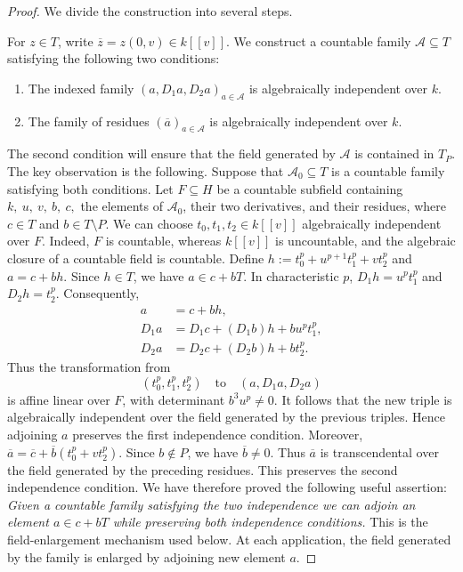 \documentclass[11pt,a4paper]{amsart}
\numberwithin{equation}{section}
\begin{document}
\begin{proof}
	We divide the construction into several steps.

For $z\in T$, write
$\overline z=z(0,v)\in k[[v]].$
We construct a countable family $\mathcal A\subseteq T$ satisfying
the following two conditions:
\begin{enumerate}
\item The indexed family
$(a,D_1a,D_2a)_{a\in\mathcal A}	$
is algebraically independent over $k$.
\item The family of residues
$(\overline a)_{a\in\mathcal A}$
is algebraically independent over $k$.
\end{enumerate}
	
The second condition will ensure that the field generated by
$\mathcal A$ is contained in $T_P$.
The key observation is the following. Suppose that
$\mathcal A_0\subseteq T$ is a countable family satisfying both
conditions. Let $F\subseteq H$ be a countable subfield containing
$	k,\ u,\ v,\ b,\ c,$
the elements of $\mathcal A_0$, their two derivatives, and
their residues, where
$	c\in T$ and $ b\in T\setminus P.$
We can choose
$t_0,t_1,t_2\in k[[v]]$
algebraically independent over $F$. Indeed, $F$ is countable,	whereas $k[[v]]$ is uncountable, and the algebraic closure of
a countable field is countable.
Define
$	h:=t_0^p+u^{p+1}t_1^p+vt_2^p$	and  $ a=c+bh$.
	Since $h\in T$, we have
$	a\in c+bT.$ In characteristic $p$,
$	D_1h=u^pt_1^p$ and $D_2h=t_2^p.$
Consequently,	\[	\begin{aligned}		a&=c+bh,\\		D_1a&=D_1c+(D_1b)h+bu^pt_1^p,\\		D_2a&=D_2c+(D_2b)h+bt_2^p.\end{aligned}	\]	Thus the transformation from	\[	(t_0^p,t_1^p,t_2^p)	\quad\text{to}\quad	(a,D_1a,D_2a)	\]	is affine linear over $F$, with determinant
$	b^3u^p\neq0.$	It follows that the new triple is algebraically independent
over the field generated by the previous triples. Hence adjoining	$a$ preserves the first independence condition.
Moreover,	$	\overline a	=\overline c+\overline b(t_0^p+vt_2^p).	$	Since $b\notin P$, we have $\overline b\neq0$. Thus	$\overline a$ is transcendental over the field generated by	the preceding residues. This preserves the second independence	condition.	We have therefore proved the following useful assertion:
\medskip
\noindent	\emph{Given a countable family satisfying the two independence
we can adjoin an element $a\in c+bT$ while preserving both
	independence conditions.}
This is the field-enlargement mechanism used below. At each
application, the field generated by the family is enlarged by
adjoining  new element $a$.
	

\end{proof}
\end{document}
